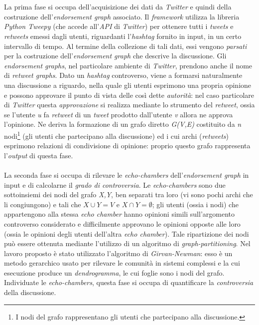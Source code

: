 \\\\La prima fase si occupa dell'acquisizione dei dati da \textit{Twitter} e quindi della costruzione dell'\textit{endorsement graph} associato. Il \textit{framework} utilizza la libreria \textit{Python Tweepy} (che accede all'\textit{API} di \textit{Twitter}) per ottenere tutti i \textit{tweets} e \textit{retweets} emessi dagli utenti, riguardanti l'\textit{hashtag} fornito in input, in un certo intervallo di tempo. Al termine della collezione di tali dati, essi vengono \textit{parsati} per la costruzione dell'\textit{endorsement graph} che descrive la discussione. Gli \textit{endorsement graphs}, nel particolare ambiente di \textit{Twitter}, prendono anche il nome di \textit{retweet graphs}. Dato un \textit{hashtag} controverso, viene a formarsi naturalmente una discussione a riguardo, nella quale gli utenti esprimono una propria opinione e possono approvare il punto di vista delle così dette \textit{autorità}: nel caso particolare di \textit{Twitter} questa \textit{approvazione} si realizza mediante lo strumento del \textit{retweet}, ossia se l'utente \textit{u} fa \textit{retweet} di un \textit{tweet} prodotto dall'utente \textit{v} allora ne approva l'opinione. Ne deriva la formazione di un grafo diretto \textit{G(V,E)} costituito da \textit{n} nodi\footnote{I nodi del grafo rappresentano gli utenti che partecipano alla discussione.} (gli utenti che partecipano alla discussione) ed i cui archi (\textit{retweets}) esprimono relazioni di condivisione di opinione: proprio questo grafo rappresenta l'\textit{output} di questa fase.
\\\\La seconda fase si occupa di rilevare le \textit{echo-chambers} dell'\textit{endorsement graph} in input e di calcolarne il \textit{grado di controversia}. Le \textit{echo-chambers} sono due sottoinsiemi dei nodi del grafo \textit{X,Y}, ben separati tra loro (vi sono pochi archi che li congiungono) e tali che \textit{$X \cup Y = V$} e \textit{$X \cap Y =  \emptyset$}; gli utenti (ossia i nodi) che appartengono alla stessa \textit{echo chamber} hanno opinioni simili sull'argomento controverso considerato e difficilmente approvano le opinioni opposte alle loro (ossia le opinioni degli utenti dell'altra \textit{echo chamber}). Tale ripartizione dei nodi può essere ottenuta mediante l'utilizzo di un algoritmo di \textit{graph-partitioning}. Nel lavoro proposto è stato utilizzato l'algoritmo di \textit{Girvan-Newman}: esso è un metodo gerarchico usato per rilevare le comunità in sistemi complessi e la cui esecuzione produce un \textit{dendrogramma}, le cui foglie sono i nodi del grafo. Individuate le \textit{echo-chambers}, questa fase si occupa di quantificare la \textit{controversia} della discussione.
